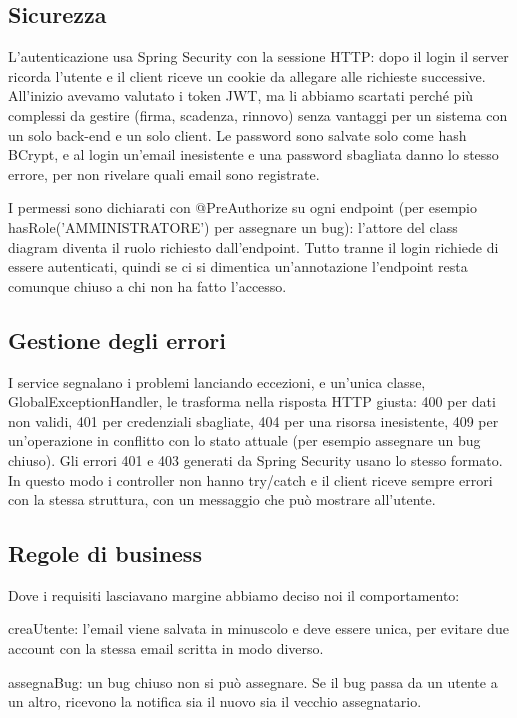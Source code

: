 \subsection{Sicurezza}
L'autenticazione usa Spring Security con la sessione HTTP: dopo il 
login il server ricorda l'utente e il client riceve un cookie da allegare 
alle richieste successive. All'inizio avevamo valutato i token JWT, ma li 
abbiamo scartati perché più complessi da gestire (firma, scadenza, rinnovo) 
senza vantaggi per un sistema con un solo back-end e un solo client. 
Le password sono salvate solo come hash BCrypt, e al login un'email 
inesistente e una password sbagliata danno lo stesso errore, per non 
rivelare quali email sono registrate. 

I permessi sono dichiarati con @PreAuthorize su ogni endpoint 
(per esempio hasRole('AMMINISTRATORE') per assegnare un bug): l'attore del 
class diagram diventa il ruolo richiesto dall'endpoint. Tutto tranne il login 
richiede di essere autenticati, quindi se ci si dimentica un'annotazione 
l'endpoint resta comunque chiuso a chi non ha fatto l'accesso. 

\subsection{Gestione degli errori}
I service segnalano i problemi lanciando eccezioni, e un'unica classe, 
GlobalExceptionHandler, le trasforma nella risposta HTTP giusta: 400 per dati non validi, 
401 per credenziali sbagliate, 404 per una risorsa inesistente, 409 per un'operazione in 
conflitto con lo stato attuale (per esempio assegnare un bug chiuso). Gli errori 401 e 
403 generati da Spring Security usano lo stesso formato. In questo modo i controller 
non hanno try/catch e il client riceve sempre errori con la stessa struttura, con un 
messaggio che può mostrare all'utente. 

\subsection{Regole di business}
Dove i requisiti lasciavano margine abbiamo deciso noi il comportamento: 

 creaUtente: l'email viene salvata in minuscolo e deve essere unica, 
per evitare due account con la stessa email scritta in modo diverso. 

 assegnaBug: un bug chiuso non si può assegnare. Se il bug passa 
da un utente a un altro, ricevono la notifica sia il nuovo sia il 
vecchio assegnatario. 

